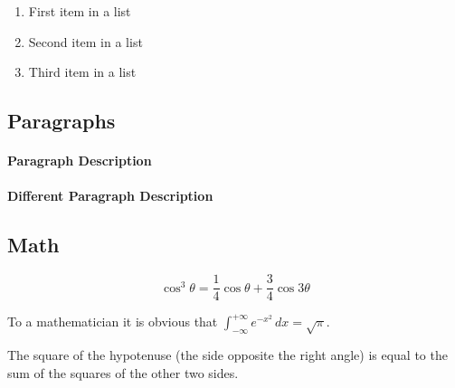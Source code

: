 \documentclass[
10pt, %
a4paper, %
oneside, %
headinclude,footinclude, %
BCOR5mm, %
]{scrartcl}
\begin{document}
\lipsum[5] %

\begin{enumerate}[noitemsep] %
\item First item in a list
\item Second item in a list
\item Third item in a list
\end{enumerate}


\subsection{Paragraphs}

\lipsum[6] %

\paragraph{Paragraph Description} \lipsum[7] %

\paragraph{Different Paragraph Description} \lipsum[8] %


\subsection{Math}

\lipsum[4] %

\begin{equation}
\cos^3 \theta =\frac{1}{4}\cos\theta+\frac{3}{4}\cos 3\theta
\label{eq:refname2}
\end{equation}

\lipsum[5] %

\begin{definition}[Gauss]
To a mathematician it is obvious that
$\int_{-\infty}^{+\infty}
e^{-x^2}\,dx=\sqrt{\pi}$.
\end{definition}

\begin{theorem}[Pythagoras]
The square of the hypotenuse (the side opposite the right angle) is equal to the sum of the squares of the other two sides.
\end{theorem}
\end{document}
